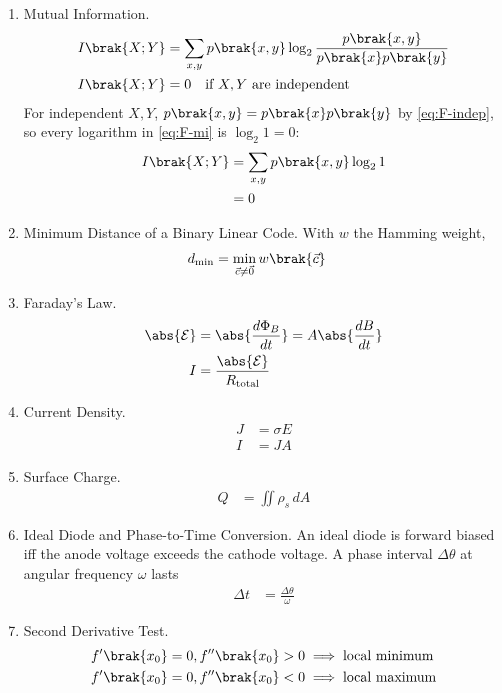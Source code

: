 \begin{enumerate}[label=\thesubsection.\arabic*, ref=\thesubsection.\theenumi]
\item Mutual Information.
\begin{align}
I\brak{X;Y} &= \sum_{x,y} p\brak{x,y} \log_2 \frac{p\brak{x,y}}{p\brak{x}p\brak{y}}
\label{eq:F-mi}
\\
I\brak{X;Y} &= 0 \quad \text{if } X, Y \text{ are independent}
\label{eq:F-mi-zero}
\end{align}
\solution For independent $X, Y$, $p\brak{x,y} = p\brak{x}p\brak{y}$ by \eqref{eq:F-indep}, so every logarithm in \eqref{eq:F-mi} is $\log_2 1 = 0$:
\begin{align}
I\brak{X;Y} &= \sum_{x,y} p\brak{x,y} \log_2 1
\\
&= 0
\end{align}
\item Minimum Distance of a Binary Linear Code. With $w$ the Hamming weight,
\begin{align}
d_{\min} &= \min_{\vec{c} \ne \vec{0}} w\brak{\vec{c}}
\label{eq:F-dmin}
\end{align}
\item Faraday's Law.
\begin{align}
\abs{\mathcal{E}} &= \abs{\frac{d\Phi_B}{dt}} = A \abs{\frac{dB}{dt}}
\\
I &= \frac{\abs{\mathcal{E}}}{R_{\mathrm{total}}}
\label{eq:F-faraday}
\end{align}
\item Current Density.
\begin{align}
J &= \sigma E
\\
I &= J A
\label{eq:F-J}
\end{align}
\item Surface Charge.
\begin{align}
Q &= \iint \rho_s \,dA
\label{eq:F-charge}
\end{align}
\item Ideal Diode and Phase-to-Time Conversion.
An ideal diode is forward biased iff the anode voltage exceeds the cathode voltage. A phase interval $\Delta \theta$ at angular frequency $\omega$ lasts
\begin{align}
\Delta t &= \frac{\Delta \theta}{\omega}
\label{eq:F-angletime}
\end{align}
\item Second Derivative Test.
\begin{align}
f'\brak{x_0} = 0, f''\brak{x_0} > 0 &\implies \text{local minimum}
\label{eq:F-second}
\\
f'\brak{x_0} = 0, f''\brak{x_0} < 0 &\implies \text{local maximum}
\end{align}

\end{enumerate}
